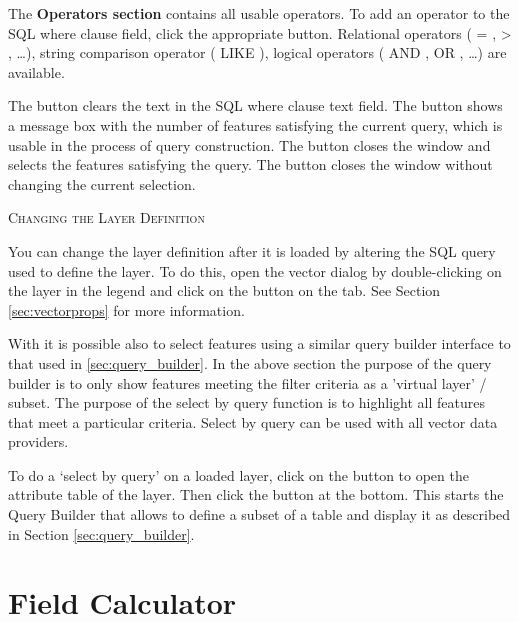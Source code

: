 The \textbf{Operators section} contains all usable operators. To add an operator
to the SQL where clause field, click the appropriate button. Relational operators
( = , > , \dots), string comparison operator ( LIKE ), logical operators ( AND , OR
, \dots) are available.

The  button clears the text in the SQL where clause text field. The
 button shows a message box with the number of features satisfying
the current query, which is usable in the process of query construction. The
 button closes the window and selects the features satisfying the
query. The  button closes the window without changing the current
selection.

\begin{Tip}\caption{\textsc{Changing the Layer Definition}}
You can change the layer definition after it is loaded by altering
the SQL query used to define the layer. To do this, open the
vector  dialog by double-clicking on the layer in the legend and click on the
 button on the  tab. See Section
\ref{sec:vectorprops} for more information.
\end{Tip}

\label{sec:select_by_query}

With \qg it is possible also to select features using a similar query builder
interface to that used in \ref{sec:query_builder}. In the above section
the purpose of the query builder is to only show features meeting the
filter criteria as a 'virtual layer' / subset. The purpose of the select by
query function is to highlight all features that meet a particular criteria.
Select by query can be used with all vector data providers.

To do a `select by query' on a loaded layer, click on the
button  to open the attribute table of the layer. Then
click the  button at the bottom. This starts the Query Builder
that allows to define a subset of a table and display it as described in Section
\ref{sec:query_builder}.

\section{Field Calculator}\label{sec:field_calculator}

